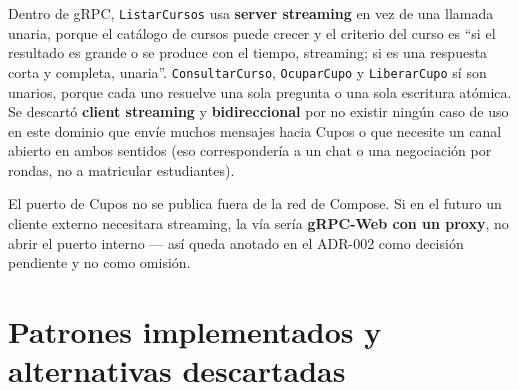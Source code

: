 \documentclass[11pt,spanish]{article}
\begin{document}
Dentro de gRPC, \texttt{ListarCursos} usa \textbf{server streaming} en vez de una llamada unaria, porque el catálogo de cursos puede crecer y el criterio del curso es ``si el resultado es grande o se produce con el tiempo, streaming; si es una respuesta corta y completa, unaria''. \texttt{ConsultarCurso}, \texttt{OcuparCupo} y \texttt{LiberarCupo} sí son unarios, porque cada uno resuelve una sola pregunta o una sola escritura atómica. Se descartó \textbf{client streaming} y \textbf{bidireccional} por no existir ningún caso de uso en este dominio que envíe muchos mensajes hacia Cupos o que necesite un canal abierto en ambos sentidos (eso correspondería a un chat o una negociación por rondas, no a matricular estudiantes).

El puerto de Cupos no se publica fuera de la red de Compose. Si en el futuro un cliente externo necesitara streaming, la vía sería \textbf{gRPC-Web con un proxy}, no abrir el puerto interno — así queda anotado en el ADR-002 como decisión pendiente y no como omisión.

\section{Patrones implementados y alternativas descartadas}\label{sec:patrones}
\end{document}
